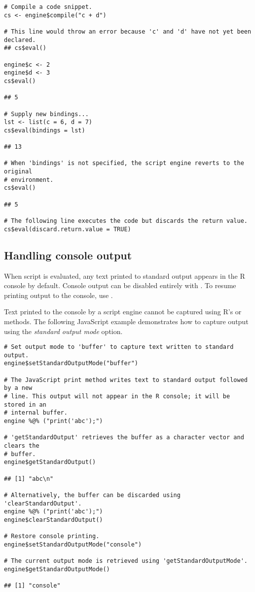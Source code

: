 \begin{verbatim}
# Compile a code snippet.
cs <- engine$compile("c + d")

# This line would throw an error because 'c' and 'd' have not yet been declared.
## cs$eval()

engine$c <- 2
engine$d <- 3
cs$eval()

## 5

# Supply new bindings...
lst <- list(c = 6, d = 7)
cs$eval(bindings = lst)

## 13

# When 'bindings' is not specified, the script engine reverts to the original
# environment.
cs$eval()

## 5

# The following line executes the code but discards the return value.
cs$eval(discard.return.value = TRUE)
\end{verbatim}

\subsection{Handling console output}

When script is evaluated, any text printed to standard output appears in the R console by default. Console output can be disabled entirely with . To resume printing output to the console, use .

Text printed to the console by a script engine cannot be captured using R's  or  methods. The following JavaScript example demonstrates how to capture output using the \textit{standard output mode}  option.

\begin{verbatim}
# Set output mode to 'buffer' to capture text written to standard output.
engine$setStandardOutputMode("buffer")

# The JavaScript print method writes text to standard output followed by a new
# line. This output will not appear in the R console; it will be stored in an
# internal buffer.
engine %@% ("print('abc');")

# 'getStandardOutput' retrieves the buffer as a character vector and clears the
# buffer.
engine$getStandardOutput()

## [1] "abc\n"

# Alternatively, the buffer can be discarded using 'clearStandardOutput'.
engine %@% ("print('abc');")
engine$clearStandardOutput()

# Restore console printing.
engine$setStandardOutputMode("console")

# The current output mode is retrieved using 'getStandardOutputMode'.
engine$getStandardOutputMode()

## [1] "console"
\end{verbatim}

